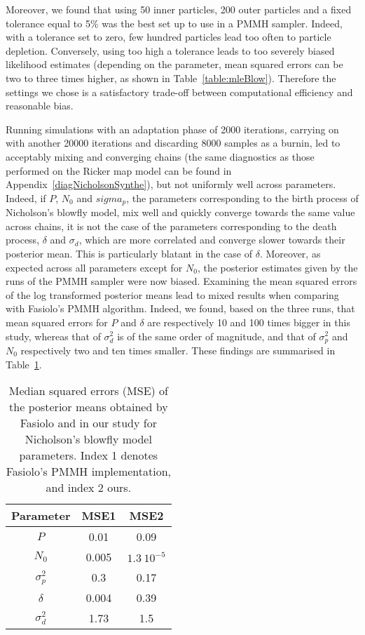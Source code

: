 \documentclass[12pt]{article}
\newcommand{\ra}[1]{\renewcommand{\arraystretch}{#1}}
\begin{document}
	
	Moreover, we found that using 50 inner particles, 200 outer particles and a fixed tolerance equal to 5\% was the best set up to use in a PMMH sampler. Indeed, with a tolerance set to zero, few hundred particles lead too often to particle depletion. Conversely, using too high a tolerance leads to too severely biased likelihood estimates (depending on the parameter, mean squared errors can be two to three times higher, as shown in Table~\ref{table:mleBlow}). Therefore the settings we chose is a satisfactory trade-off between computational efficiency and reasonable bias.
	
	Running simulations with an adaptation phase of 2000 iterations, carrying on with another 20000 iterations and discarding 8000 samples as a burnin, led to acceptably mixing and converging chains (the same diagnostics as those performed on the Ricker map model can be found in Appendix~\ref{diagNicholsonSynthe}), but not uniformly well across parameters. Indeed, if $P$, $N_0$ and $sigma_p$, the parameters corresponding to the birth process of Nicholson's blowfly model, mix well and quickly converge towards the same value across chains, it is not the case of the parameters corresponding to the death process, $\delta$ and $\sigma_d$, which are more correlated and converge slower towards their posterior mean. This is particularly blatant in the case of $\delta$. Moreover, as expected across all parameters except for $N_0$, the posterior estimates given by the runs of the PMMH sampler were now biased. Examining the mean squared errors of the log transformed posterior means lead to mixed results when comparing with Fasiolo's PMMH algorithm. Indeed, we found, based on the three runs, that mean squared errors for $P$ and $\delta$ are respectively 10 and 100 times bigger in this study, whereas that of $\sigma_d^2$ is of the same order of magnitude, and that of $\sigma_p^2$ and $N_0$ respectively two and ten times smaller. These findings are summarised in Table~\ref{table:mseBlowfly}.

	\begin{table}[htb]
		\centering
		\vspace{10mm}
		\ra{1.3}
		\begin{tabular}{@{}ccc@{}} \toprule
			Parameter & MSE1 & MSE2 \\ \midrule 
			$P$ & 0.01 & 0.09 \\ 
			$N_0$ & 0.005 & $1.3 \ 10^{-5}$  \\ 
			$\sigma_p^2$ & 0.3 & 0.17  \\
			$\delta$ & 0.004 & 0.39  \\
			$\sigma_d^2$ & 1.73 & 1.5  \\ \bottomrule
		\end{tabular}
		\caption[Comparison between the mean square errors of posterior estimates of the parameters obtain in this study and in Fasiolo's, Nicholson's blowfly model ]{Median squared errors (MSE) of the posterior means obtained by Fasiolo and in our study for Nicholson's blowfly model parameters. Index 1 denotes Fasiolo's PMMH implementation, and index 2 ours.}
		\label{table:mseBlowfly}
	\end{table}
\end{document}

